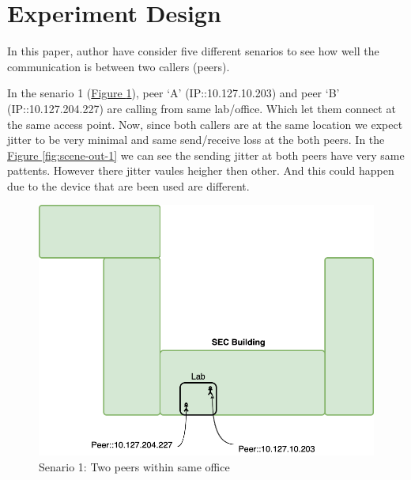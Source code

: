 \section{Experiment Design}	\label{sec:experiments}
	In this paper, author have consider five different senarios to see how well the communication is between two callers (peers). 
	
	In the senario 1 (\hyperref[fig:scene-1]{Figure \ref{fig:scene-1}}), peer `A' (IP::10.127.10.203) and peer `B' (IP::10.127.204.227) are calling from same lab/office. Which let them connect at the same access point. Now, since both callers are at the same location we expect jitter to be very minimal and same send/receive loss at the both peers. In the \hyperref[fig:scene-out-1]{Figure \ref{fig:scene-out-1}} we can see the sending jitter at both peers have very same pattents. However there jitter vaules heigher then other. And this could happen due to the device that are been used are different. 
	\begin{figure}[tbh]
		\begin{minipage}{\textwidth}
			\includegraphics[scale=0.29]{Images/experiment/senarios/in_lab.drawio.png}
		\end{minipage}
		\caption{Senario 1: Two peers within same office}
		\label{fig:scene-1}
	\end{figure}


